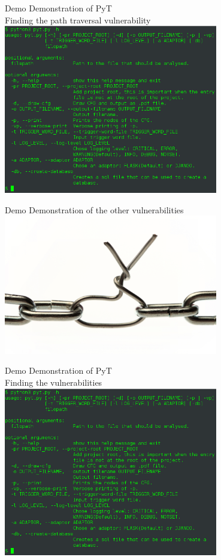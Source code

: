 \begin{frame}{Demo}
  \centering
  Demonstration of PyT \\
  Finding the path traversal vulnerability
    \includegraphics[width=0.7\textwidth]{graphics/pyt_overview.png}
\end{frame}


\begin{frame}{Demo}
  \centering
    Demonstration of the other vulnerabilities
    \includegraphics[width=0.7\textwidth]{graphics/vulnerability}
\end{frame}


\begin{frame}{Demo}
  \centering
  Demonstration of PyT \\
  Finding the vulnerabilities
    \includegraphics[width=0.7\textwidth]{graphics/pyt_overview.png}
\end{frame}


